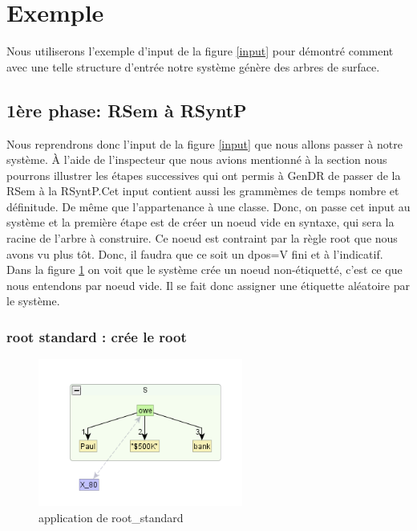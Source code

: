 \section{Exemple}

Nous utiliserons l'exemple d'input de la figure \ref{input} pour démontré comment avec une telle structure d'entrée notre système génère des arbres de surface.

\subsection{1ère phase: RSem à RSyntP}
Nous reprendrons donc l'input de la figure \ref{input} que nous allons passer à notre système. À l'aide de l'inspecteur que nous avions mentionné à la section  nous pourrons illustrer les étapes successives qui ont permis à GenDR de passer de la RSem à la RSyntP.Cet input contient aussi les grammèmes de temps nombre et définitude. De même que l'appartenance à une classe. Donc, on passe cet input au système et la première étape est de créer un noeud vide en syntaxe, qui sera la racine de l'arbre à construire. Ce noeud est contraint par la règle root que nous avons vu plus tôt. Donc, il faudra que ce soit un dpos=V fini et à l'indicatif. Dans la figure \ref{fig:rootstand} on voit que le système crée un noeud non-étiquetté, c'est ce que nous entendons par noeud vide. Il se fait donc assigner une étiquette aléatoire par le système.

\subsubsection{root standard : crée le root}
\begin{figure}[htb]
	\centering
	\includegraphics[width=0.6\textwidth, trim = {0cm 0cm 0cm 0cm},clip]{ch3/figs/inspecteur_root.png}
	\vspace{-0.5cm}
	\caption{application de root\_standard}
	\label{fig:rootstand}
\end{figure}

